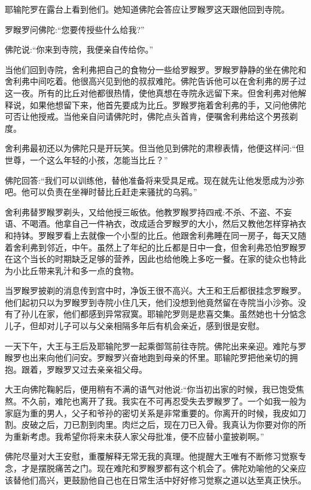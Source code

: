\documentclass[12pt,twoside,openany]{book}
\begin{document}
耶输陀罗在露台上看到他们。她知道佛陀会答应让罗睺罗这天跟他回到寺院。

罗睺罗问佛陀:“您要传授些什么给我?”

佛陀说:“你来到寺院，我便亲自传给你。”

当他们回到寺院，舍利弗把自己的食物分一些给罗睺罗。罗睺罗静静的坐在佛陀和舍利弗中间吃着。他很高兴见到他的叔叔难陀。佛陀告诉他可以在舍利弗的房子过这一夜。所有的比丘对他都很热情，使他真想在寺院永远留下来。但舍利弗对他解释说，如果他想留下来，他首先要成为比丘。罗睺罗拖着舍利弗的手，又问他佛陀可否让他授戒。当他亲自问请佛陀时，佛陀点头首肯，便嘱舍利弗给这个男孩剃度。

舍利弗最初还以为佛陀只是开玩笑。但当他见到佛陀的肃穆表情，他便这样问:“但世尊，一个这么年轻的小孩，怎能当比丘？”

佛陀回答:“我们可以训练他，替他准备将来受具足戒。现在就先让他发愿成为沙弥吧。他可以负责在坐禅时替比丘赶走来骚扰的乌鸦。”

舍利弗替罗睺罗剃头，又给他授三皈依。他教罗睺罗持四戒:不杀、不盗、不妄语、不喝酒。他拿自己一件衲衣，改成适合罗睺罗的大小，然后又教他怎样穿衲衣和持钵。罗睺罗看上去就像一个小型的比丘。他跟舍利弗睡在同一房子，每天又随着舍利弗到邻近，中午。虽然上了年纪的比丘都是日中一食，但舍利弗恐怕罗睺罗在这个当长的时期缺乏足够的营养，因此也给他晚上多吃一餐。在家的徒众也特此为小比丘带来乳汁和多一点的食物。

当罗睺罗披剃的消息传到宫中时，净饭王很不高兴。大王和王后都很挂念罗睺罗。他们起初只以为罗睺罗到寺院小住几天，他们没想到他竟然留在寺院当小沙弥。没有了孙儿在家，他们都感到异常寂寞。耶输陀罗则是悲喜交集。虽然她也十分惦念儿子，但却对儿子可以与父亲相隔多年后有机会亲近，感到很是安慰。

一天下午，大王与王后及耶输陀罗一起乘御驾前往寺院。佛陀出来亲迎。难陀与罗睺罗也出来向他们问安。罗睺罗兴奋地跑到母亲的怀里。耶输陀罗把他亲切的拥抱。跟着，罗睺罗又过去亲亲祖父母。

大王向佛陀鞠躬后，便用稍有不满的语气对他说:“你当初出家的时候，我已饱受焦熬。不久前，难陀也离开了我。我实在不可再忍受失去罗睺罗了。一个如我一般为家庭为重的男人，父子和爷孙的密切关系是非常重要的。你离开的时候，我皮如刀割。皮破之后，刀已割到肉里。肉烂之后，现在刀已入骨。我真认为你要对你的所为重新考虑。我希望你将来未获人家父母批准，便不应替小童披剃啊。”

佛陀尽量对大王安慰，重覆解释无常无我的真理。他提醒大王唯有不断修习觉察专念，才是摆脱痛苦之门。现在难陀和罗睺罗都有这个机会了。佛陀劝喻他的父亲应该替他们高兴，更鼓励他自己也在日常生活中好好修习觉察之道以达至真正快乐。
\end{document}
